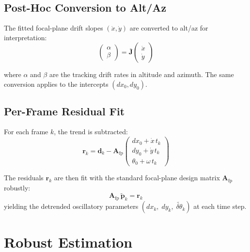 \documentclass[SE,lsstdraft,authoryear,toc]{lsstdoc}
\begin{document}
\subsection{Post-Hoc Conversion to Alt/Az}

The fitted focal-plane drift slopes $(\dot{x}, \dot{y})$ are
converted to alt/az for interpretation:
\begin{equation}
\begin{pmatrix} \alpha \\ \beta \end{pmatrix}
= \bar{\mathbf{J}}
\begin{pmatrix} \dot{x} \\ \dot{y} \end{pmatrix}
\label{eq:posthoc_altaz}
\end{equation}

\noindent
where $\alpha$ and $\beta$ are the tracking drift rates in altitude
and azimuth.  The same conversion applies to the intercepts
$(dx_0, dy_0)$.

\subsection{Per-Frame Residual Fit}
\label{sec:perframe_resid}

For each frame $k$, the trend is subtracted:
\begin{equation}
\mathbf{r}_{k} = \mathbf{d}_k
- \mathbf{A}_{\mathrm{fp}}
  \begin{pmatrix}
  dx_0 + \dot{x}\,t_k \\
  dy_0 + \dot{y}\,t_k \\
  \theta_0 + \omega\,t_k
  \end{pmatrix}
\label{eq:trend_residuals}
\end{equation}

\noindent
The residuals $\mathbf{r}_k$ are then fit with the standard
focal-plane design matrix $\mathbf{A}_{\mathrm{fp}}$ robustly:
\begin{equation}
\mathbf{A}_{\mathrm{fp}}\,\widetilde{\mathbf{p}}_k = \mathbf{r}_k
\end{equation}
yielding the detrended oscillatory parameters
$(dx_k,\; dy_k,\; \widetilde{\delta\theta}_k)$ at each time step.

\section{Robust Estimation}
\label{sec:robust}
\end{document}
